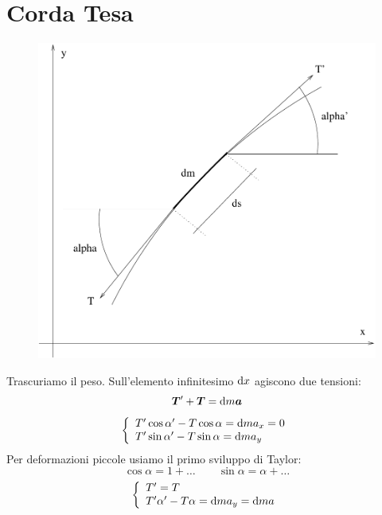 \section{Corda Tesa}
\begin{figure}[htbp]
   \centering
   \includegraphics[scale=0.4]{immagini/fisica1/Onde_Corda}
\end{figure}
Trascuriamo il peso. Sull'elemento infinitesimo $\mathrm{d} x$ agiscono due tensioni:
\begin{equation*}\boldsymbol{T}'+\boldsymbol{T}=\mathrm{d} m \boldsymbol{a}\end{equation*}
\begin{equation*}\left\{\begin{array}{l}
T'\cos\alpha'-T\cos\alpha=\mathrm{d} m a_x=0\\
T'\sin\alpha'-T\sin\alpha=\mathrm{d} m a_y\\
\end{array}\right.\end{equation*}
Per deformazioni piccole usiamo il primo sviluppo di Taylor:
\begin{equation*}\cos \alpha=1+\ldots\qquad \sin \alpha=\alpha+\ldots\end{equation*}
\begin{equation*}\left\{\begin{array}{l}
T'=T\\
T'\alpha'-T\alpha=\mathrm{d} m a_y=\mathrm{d} m a\\
\end{array}\right.\end{equation*}
